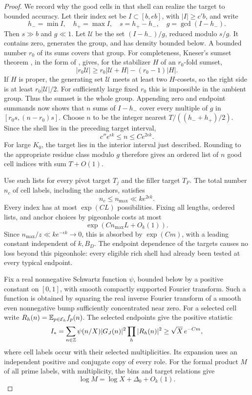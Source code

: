 \begin{proof}
We record why the good cells in that shell can realize the target
to bounded accuracy. Let their index set be \(I\subset[b,eb]\),
with \(|I|\ge c'b\), and write
\[
 h_-=\min I,\quad h_+=\max I,\quad s=h_+-h_-,
 \quad g=\gcd(I-h_-).
\]
Then \(s\gg b\) and \(g\ll1\). Let \(\mathcal U\) be the set
\((I-h_-)/g\), reduced modulo \(s/g\). It contains zero, generates
the group, and has density bounded below. A bounded number \(r_0\)
of its sums covers that group. For completeness, Kneser's sumset
theorem \cite{Kneser1953}, in the form of
\cite[Theorem~1]{DeVos}, gives, for the stabilizer \(H\) of an
\(r_0\)-fold sumset,
\[
 |r_0\mathcal U|
       \ge r_0|\mathcal U+H|-(r_0-1)|H|.
\]
If \(H\) is proper, the generating set \(\mathcal U\) meets at least
two \(H\)-cosets, so the right side is at least \(r_0|\mathcal U|/2\).
For sufficiently large fixed \(r_0\) this is impossible in the
ambient group. Thus the sumset is the whole group. Appending zero
and endpoint summands now shows that \(n\) sums of \(I-h_-\)
cover every multiple of \(g\) in
\([r_0s,(n-r_0)s]\).
Choose \(n\) to be the integer nearest
\(T/((h_-+h_+)/2)\). Since the shell lies in the preceding target
interval,
\[
 c''e^{\epsilon k}\le n\le C e^{2\epsilon k}.
\]
For large \(K_0\), the target lies in the interior interval just
described. Rounding to the appropriate residue class modulo \(g\)
therefore gives an ordered list of \(n\) good cell indices with
sum \(T+O(1)\).

Use such lists for every pivot target \(T_j\) and the filler target
\(T_F\). The total number \(n_c\) of cell labels, including the
anchors, satisfies
\[
 n_c\le n_{\max}\ll k e^{2\epsilon k}.
\]
Every index has at most \(\exp(CL)\) possibilities. Fixing all
lengths, ordered lists, and anchor choices by pigeonhole costs at
most
\[
 \exp(Cn_{\max}L+O_k(1)).
\]
Since \(n_{\max}/z\ll k e^{-\epsilon k}\to0\), this is absorbed
by \(\exp(Cm)\), with a leading constant independent of \(k,B_D\).
The endpoint dependence of the targets causes no loss beyond this
pigeonhole: every eligible rich shell had already been tested at
every typical endpoint.

Fix a real nonnegative Schwartz function \(\psi\), bounded below
by a positive constant on \([0,1]\), with smooth compactly
supported Fourier transform. Such a function is obtained by
squaring the real inverse Fourier transform of a smooth even
nonnegative bump sufficiently concentrated near zero.
For a selected cell write
\(R_h(n)=\mathbb E_{p\in\mathcal E_h}f_p(n)\). The selected endpoints
give the positive statistic
\begin{equation}\label{eq:src18}
 I_*=\sum_{n\in\mathbb Z}\psi(n/X)|G_J(n)|^2
             \prod_h|R_h(n)|^2
       \ge \sqrt X\,e^{-Cm},
\end{equation}
where cell labels occur with their selected multiplicities.
Its expansion uses an independent positive and conjugate copy
of every role. For the formal product \(M\) of all prime labels,
with multiplicity, the bins and target relations give
\[
 \log M=\log X+\Delta_0+O_k(1).
\]


\end{proof}
